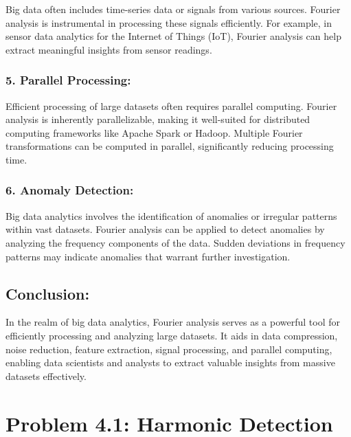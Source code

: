 \documentclass[11pt]{article}
\begin{document}
Big data often includes time-series data or signals from various
sources. Fourier analysis is instrumental in processing these signals
efficiently. For example, in sensor data analytics for the Internet of
Things (IoT), Fourier analysis can help extract meaningful insights from
sensor readings.

\hypertarget{parallel-processing}{%
\subsubsection{\texorpdfstring{\textbf{5. Parallel
Processing:}}{5. Parallel Processing:}}\label{parallel-processing}}

Efficient processing of large datasets often requires parallel
computing. Fourier analysis is inherently parallelizable, making it
well-suited for distributed computing frameworks like Apache Spark or
Hadoop. Multiple Fourier transformations can be computed in parallel,
significantly reducing processing time.

\hypertarget{anomaly-detection}{%
\subsubsection{\texorpdfstring{\textbf{6. Anomaly
Detection:}}{6. Anomaly Detection:}}\label{anomaly-detection}}

Big data analytics involves the identification of anomalies or irregular
patterns within vast datasets. Fourier analysis can be applied to detect
anomalies by analyzing the frequency components of the data. Sudden
deviations in frequency patterns may indicate anomalies that warrant
further investigation.

\hypertarget{conclusion}{%
\subsection{Conclusion:}\label{conclusion}}

In the realm of big data analytics, Fourier analysis serves as a
powerful tool for efficiently processing and analyzing large datasets.
It aids in data compression, noise reduction, feature extraction, signal
processing, and parallel computing, enabling data scientists and
analysts to extract valuable insights from massive datasets effectively.

    \hypertarget{problem-4.1-harmonic-detection}{%
\section{Problem 4.1: Harmonic
Detection}\label{problem-4.1-harmonic-detection}}
\end{document}
